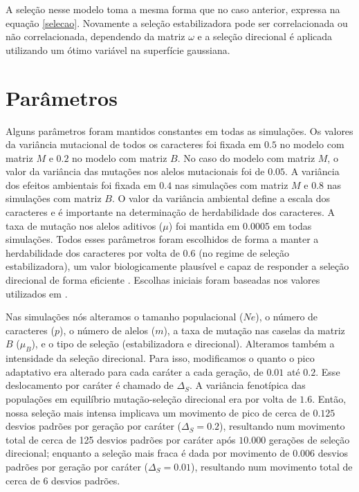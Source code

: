 A seleção nesse modelo toma a mesma forma que no caso anterior, expressa
na equação \ref{selecao}.
Novamente a seleção estabilizadora pode ser correlacionada ou não
correlacionada, dependendo da matriz $\omega$ e a seleção direcional é
aplicada utilizando um ótimo variável na superfície gaussiana.

\section{Parâmetros}\label{cap2:parametros}

Alguns parâmetros foram mantidos constantes em todas as simulações.  Os
valores da variância mutacional de todos os caracteres foi fixada em
$0.5$ no modelo com matriz $M$ e $0.2$ no modelo com matriz $B$.
No caso do modelo com matriz $M$, o valor da variância das mutações nos
alelos mutacionais foi de $0.05$.
A variância dos efeitos ambientais foi fixada em $0.4$ nas simulações com
matriz $M$ e $0.8$ nas simulações com matriz $B$.
O valor da variância ambiental define a escala dos caracteres e é importante
na determinação de herdabilidade dos caracteres.
A taxa de mutação nos alelos aditivos ($\mu$) foi mantida em $0.0005$ em
todas simulações.
Todos esses parâmetros foram escolhidos de forma a manter a
herdabilidade dos caracteres por volta de $0.6$ (no regime de seleção
estabilizadora), um valor biologicamente plausível e capaz de responder
a seleção direcional de forma eficiente \citep{Cheverud1988}.
Escolhas iniciais foram baseadas nos valores utilizados em
\cite{Jones2003, Jones2004, Jones2007}.

Nas simulações nós alteramos o tamanho populacional ($Ne$), o número de
caracteres ($p$), o número de alelos ($m$), a taxa de mutação nas caselas da
matriz $B$ ($\mu_B$), e o tipo de seleção (estabilizadora e direcional).
Alteramos também a intensidade da seleção direcional.
Para isso, modificamos o quanto o pico adaptativo era alterado para cada
caráter a cada geração, de $0.01$ até $0.2$.
Esse deslocamento por caráter é chamado de $\Delta_S$.
A variância fenotípica das populações em equilíbrio mutação-seleção
direcional era por volta de $1.6$.
Então, nossa seleção mais intensa implicava um movimento de pico de
cerca de $0.125$ desvios padrões por geração por caráter ($\Delta_S=0.2$),
resultando num movimento total de cerca de 125 desvios padrões por caráter
após $10.000$ gerações de seleção direcional; enquanto a seleção mais
fraca é dada por movimento de $0.006$ desvios padrões por geração por caráter
($\Delta_S=0.01$), resultando num movimento total de cerca de 6 desvios
padrões.

